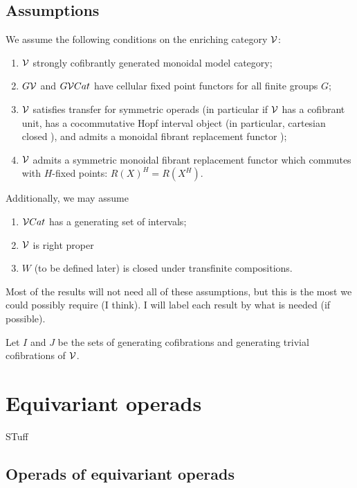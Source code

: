 \documentclass[psamsfonts,onesided,10pt,letterpaper]{amsart}%
\begin{document}
\subsection{Assumptions}

We assume the following conditions on the enriching category $\mathcal V$:

\begin{enumerate}
\item $\mathcal V$ strongly cofibrantly generated monoidal model category;
\item $G\mathcal V$ and $G\mathcal V Cat$ have cellular fixed point functors for all finite groups $G$;
\item $\mathcal V$ satisfies transfer for symmetric operads (in particular if $\mathcal V$ has a cofibrant unit, has a cocommutative Hopf interval object (in particular, cartesian closed \cite{BM03}), and admits a monoidal fibrant replacement functor \cite{BM07});
\item $\mathcal V$ admits a symmetric monoidal fibrant replacement functor which commutes with $H$-fixed points: $R(X)^H = R(X^H)$. 
\end{enumerate}

Additionally, we may assume
\begin{enumerate}
\item $\mathcal V Cat$ has a generating set of intervals;
\item $\mathcal V$ is right proper
\item $W$ (to be defined later) is closed under transfinite compositions.
\end{enumerate}

Most of the results will not need all of these assumptions, but this is the most we could possibly require (I think). I will label each result by what is needed (if possible).

Let $I$ and $J$ be the sets of generating cofibrations and generating trivial cofibrations of $\mathcal V$.


\newpage
\section{Equivariant operads}

STuff

\subsection{Operads of equivariant operads}
\end{document}
